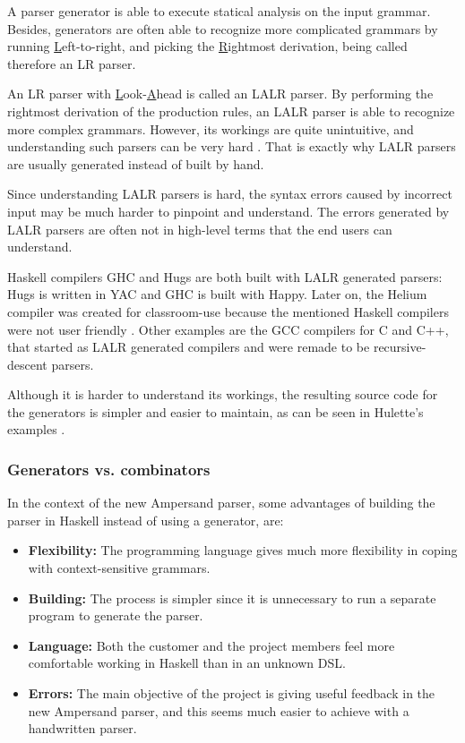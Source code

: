 %
A parser generator is able to execute statical analysis on the input grammar.
Besides, generators are often able to recognize more complicated grammars by running \underline{L}eft-to-right, and picking the \underline{R}ightmost derivation, being called therefore an LR parser.

%
An LR parser with \underline{L}ook-\underline{A}head is called an LALR parser.
By performing the rightmost derivation of the production rules, an LALR parser is able to recognize more complex grammars.
However, its workings are quite unintuitive, and understanding such parsers can be very hard .
That is exactly why LALR parsers are usually generated instead of built by hand.

Since understanding LALR parsers is hard, the syntax errors caused by incorrect input may be much harder to pinpoint and understand.
The errors generated by LALR parsers are often not in high-level terms that the end users can understand.

%
%
%
%
%
Haskell compilers GHC and Hugs are both built with LALR generated parsers: Hugs is written in YAC and GHC is built with Happy.
Later on, the Helium compiler was created for classroom-use because the mentioned Haskell compilers were not user friendly .
Other examples are the GCC compilers for C and C++, that started as LALR generated compilers and were remade to be recursive-descent parsers.

Although it is harder to understand its workings, the resulting source code for the generators is simpler and easier to maintain, as can be seen in Hulette's examples .

\subsubsection{Generators vs. combinators}
In the context of the new Ampersand parser, some advantages of building the parser in Haskell instead of using a generator, are:
\begin{itemize}
	\item \textbf{Flexibility:} The programming language gives much more flexibility in coping with context-sensitive grammars.
	\item \textbf{Building:} The process is simpler since it is unnecessary to run a separate program to generate the parser.
	\item \textbf{Language:} Both the customer and the project members feel more comfortable working in Haskell than in an unknown DSL.
	\item \textbf{Errors:} The main objective of the project is giving useful feedback in the new Ampersand parser, and this seems much easier to achieve with a handwritten parser.
\end{itemize}

